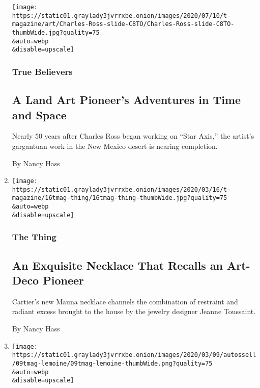 \begin{enumerate}
  \texttt{[image: https://static01.graylady3jvrrxbe.onion/images/2020/07/10/t-magazine/art/Charles-Ross-slide-C8TO/Charles-Ross-slide-C8TO-thumbWide.jpg?quality=75\\\&auto=webp\\\&disable=upscale]}

  \hypertarget{true-believers}{%
  \subsubsection{True Believers}\label{true-believers}}

  \hypertarget{a-land-art-pioneers-adventures-in-time-and-space}{%
  \subsection{A Land Art Pioneer's Adventures in Time and
  Space}\label{a-land-art-pioneers-adventures-in-time-and-space}}

  Nearly 50 years after Charles Ross began working on ``Star Axis,'' the
  artist's gargantuan work in the New Mexico desert is nearing
  completion.

  By Nancy Hass
\item
  \href{/2020/03/16/t-magazine/cartier-mauna-necklace.html}{}

  \texttt{[image: https://static01.graylady3jvrrxbe.onion/images/2020/03/16/t-magazine/16tmag-thing/16tmag-thing-thumbWide.jpg?quality=75\\\&auto=webp\\\&disable=upscale]}

  \hypertarget{the-thing-1}{%
  \subsubsection{The Thing}\label{the-thing-1}}

  \hypertarget{an-exquisite-necklace-that-recalls-an-art-deco-pioneer}{%
  \subsection{An Exquisite Necklace That Recalls an Art-Deco
  Pioneer}\label{an-exquisite-necklace-that-recalls-an-art-deco-pioneer}}

  Cartier's new Mauna necklace channels the combination of restraint and
  radiant excess brought to the house by the jewelry designer Jeanne
  Toussaint.

  By Nancy Hass
\item
  \href{/2020/03/11/t-magazine/rem-koolhaas-pierre-paulin.html}{}

  \texttt{[image: https://static01.graylady3jvrrxbe.onion/images/2020/03/09/autossell/09tmag-lemoine/09tmag-lemoine-thumbWide.png?quality=75\\\&auto=webp\\\&disable=upscale]}


\end{enumerate}
